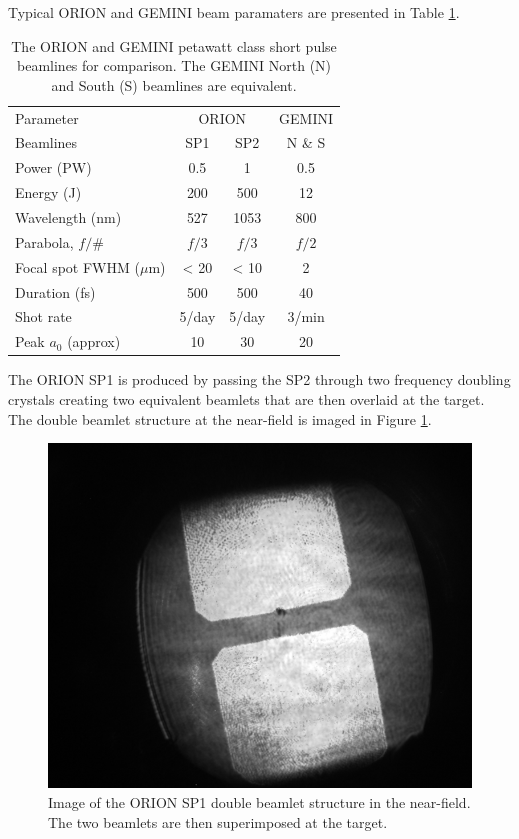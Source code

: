 Typical ORION and GEMINI beam paramaters are presented in Table \ref{tab:laser_params}.
\begin{table}[]
	\centering
	\begin{tabular}{lccc}
		\hline \hline
		Parameter                & \multicolumn{2}{c}{ORION} & GEMINI \\ 
		Beamlines                & SP1         & SP2         & N \& S  \\ \hline
		Power (PW)               & 0.5         & 1           & 0.5    \\
		Energy (J)               & 200         & 500         & 12     \\
		Wavelength (nm)          & 527         & 1053        & 800    \\
		Parabola, $f/\#$ & $f/3$        & $f/3$        & $f/2$      \\
		Focal spot FWHM ($\mu$m) & < 20        & < 10        & 2      \\
		Duration (fs)            & 500         & 500         & 40     \\
		Shot rate                & 5/day       & 5/day       & 3/min  \\
		Peak $a_0$ (approx)      & 10          & 30          & 20    \\ \hline \hline
	\end{tabular}
	\caption{The ORION and GEMINI petawatt class short pulse beamlines for comparison. The GEMINI North (N) and South (S) beamlines are equivalent.}
	\label{tab:laser_params}
\end{table}
The ORION SP1 is produced by passing the SP2 through two frequency doubling crystals creating two equivalent beamlets that are then overlaid at the target. The double beamlet structure at the near-field is imaged in Figure \ref{fig:oriondoublebeamletsnearfield}.
\begin{figure}
	\centering
	\includegraphics[width=0.5\linewidth]{figures/orion/orion_doublebeamlets_near_field}
	\caption[Image of the ORION SP1 double beamlet structure in the near-field.]{Image of the ORION SP1 double beamlet structure in the near-field. The two beamlets are then superimposed at the target.}
	\label{fig:oriondoublebeamletsnearfield}
\end{figure}


